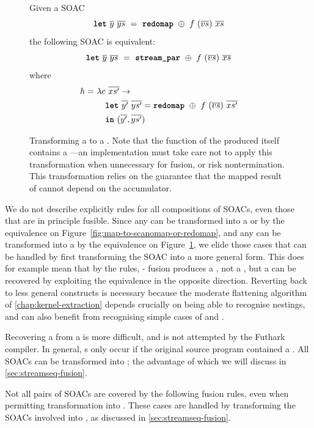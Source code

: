 \begin{figure}[bt]
  Given a SOAC
\[
  \mbox{\texttt{\bfseries{let}}}~\overline{y}~\overline{ys}~=~\mbox{\texttt{\bfseries{redomap}}}~\oplus~f~(\overline{vs})~\overline{xs}
\]
the following SOAC is equivalent:
\[
  \mbox{\texttt{\bfseries{let}}}~\overline{y}~\overline{ys}~=~\mbox{\texttt{\bfseries{stream\_par}}}~\oplus~f~(\overline{vs})~\overline{xs}
\]
where \begin{align*}
        h =~& \lambda c~\overline{xs'} \rightarrow \\
            & \quad \mbox{\texttt{\bfseries{let}}}~\overline{y'}~\overline{ys'} = \mbox{\texttt{\bfseries{redomap}}}~\oplus~f~(\overline{vs})~\overline{xs'} \\
            & \quad \mbox{\texttt{\bfseries{in}}}~(\overline{y'}, \overline{ys'})
  \end{align*}
  \caption{Transforming a  to a \StreamPar.  Note that the
    function of the produced \StreamPar{} itself contains a
    ---an implementation must take care not to apply this
    transformation when unnecessary for fusion, or risk
    nontermination.  This transformation relies on the guarantee that
    the mapped result of  cannot depend on the accumulator.}
  \label{fig:redomap-to-streamred}
\end{figure}

We do not describe explicitly rules for all compositions of SOACs,
even those that are in principle fusible.  Since any  can be
transformed into a  or  by the equivalence on
Figure~\ref{fig:map-to-scanomap-or-redomap}, and any  can
be transformed into a \StreamPar{} by the equivalence on
Figure~\ref{fig:redomap-to-streamred}, we elide those cases that can
be handled by first transforming the SOAC into a more general form.
This does for example mean that by the rules, - fusion
produces a , not a , but a  can be
recovered by exploiting the equivalence in the opposite direction.
Reverting back to less general constructs is necessary because the
moderate flattening algorithm of \cref{chap:kernel-extraction} depends
crucially on being able to recognise  nestings, and can also
benefit from recognising simple cases of  and .

Recovering a  from a \StreamPar{} is more difficult, and is
not attempted by the Futhark compiler.  In general, \StreamPar{}s only
occur if the original source program contained a \StreamRed{}.  All
SOACs can be transformed into \StreamSeq; the advantage of which we
will discuss in \cref{sec:streamseq-fusion}.

Not all pairs of SOACs are covered by the following fusion rules, even
when permitting transformation into \StreamPar{}.  These cases are
handled by transforming the SOACs involved into \StreamSeq{}, as
discussed in \cref{sec:streamseq-fusion}.

